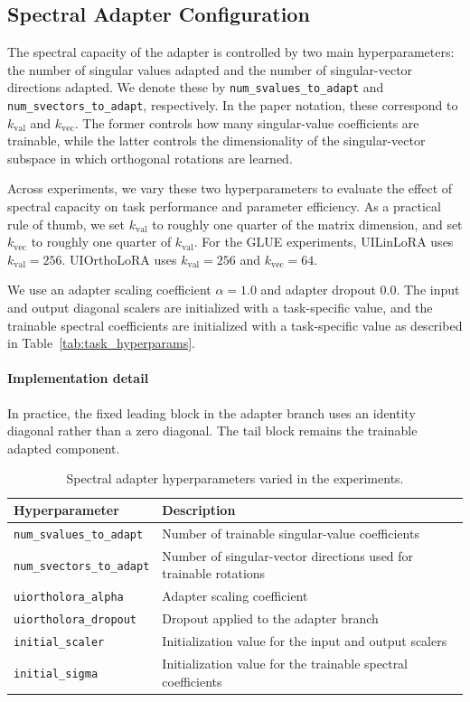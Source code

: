 \documentclass{article}
\begin{document}
\subsection{Spectral Adapter Configuration}

The spectral capacity of the adapter is controlled by two main hyperparameters:
the number of singular values adapted and the number of singular-vector
directions adapted. We denote these by
\texttt{num\_svalues\_to\_adapt} and
\texttt{num\_svectors\_to\_adapt}, respectively. In the paper notation, these
correspond to \(k_{\mathrm{val}}\) and \(k_{\mathrm{vec}}\). The former controls
how many singular-value coefficients are trainable, while the latter controls
the dimensionality of the singular-vector subspace in which orthogonal rotations
are learned.

Across experiments, we vary these two hyperparameters to evaluate the effect of
spectral capacity on task performance and parameter efficiency. As a practical
rule of thumb, we set \(k_{\mathrm{val}}\) to roughly one quarter of the matrix
dimension, and set \(k_{\mathrm{vec}}\) to roughly one quarter of
\(k_{\mathrm{val}}\). For the GLUE experiments, UILinLoRA uses
\(k_{\mathrm{val}}=256\). UIOrthoLoRA uses \(k_{\mathrm{val}}=256\) and
\(k_{\mathrm{vec}}=64\).

We use an adapter scaling coefficient
\(\alpha = 1.0\) and adapter dropout \(0.0\). The input and output diagonal
scalers are initialized with a task-specific value, and the trainable spectral
coefficients are initialized with a task-specific value as described in
Table~\ref{tab:task_hyperparams}.

\paragraph{Implementation detail}
In practice, the fixed leading block in the adapter branch uses an identity diagonal rather than a zero diagonal. The tail block remains the trainable adapted component.

\begin{table}[h]
\centering
\caption{Spectral adapter hyperparameters varied in the experiments.}
\label{tab:spectral_hyperparams}
\begin{tabular}{ll}
\toprule
Hyperparameter & Description \\
\midrule
\texttt{num\_svalues\_to\_adapt} & Number of trainable singular-value coefficients \\
\texttt{num\_svectors\_to\_adapt} & Number of singular-vector directions used for trainable rotations \\
\texttt{uiortholora\_alpha} & Adapter scaling coefficient \\
\texttt{uiortholora\_dropout} & Dropout applied to the adapter branch \\
\texttt{initial\_scaler} & Initialization value for the input and output scalers \\
\texttt{initial\_sigma} & Initialization value for the trainable spectral coefficients \\
\bottomrule
\end{tabular}
\end{table}
\end{document}
